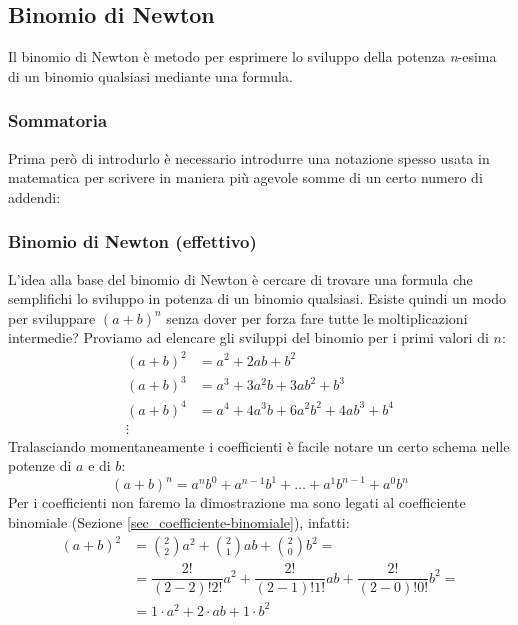 \subsection{Binomio di Newton} \label{sec_binomioNewton}
Il binomio di Newton è metodo per esprimere lo sviluppo della potenza \textit{n}-esima di un binomio qualsiasi mediante una formula.
\subsubsection{Sommatoria} \label{sec_sommatoria}
Prima però di introdurlo è necessario introdurre una notazione spesso usata in matematica per scrivere in maniera più agevole somme di un certo numero di addendi:

\subsubsection{Binomio di Newton (effettivo)}
L'idea alla base del binomio di Newton è cercare di trovare una formula che semplifichi lo sviluppo in potenza di un binomio qualsiasi. Esiste quindi un modo per sviluppare $(a+b)^n$ senza dover per forza fare tutte le moltiplicazioni intermedie? Proviamo ad elencare gli sviluppi del binomio per i primi valori di $n$:
\begin{align*}
    (a+b)^2 &= a^2 + 2ab + b^2\\
    (a+b)^3 &= a^3 + 3a^2b + 3ab^2 + b^3\\
    (a+b)^4 &= a^4 + 4a^3b + 6a^2b^2 + 4ab^3 + b^4\\
    \vdots \qquad
\end{align*}
Tralasciando momentaneamente i coefficienti è facile notare un certo schema nelle potenze di $a$ e di $b$:
\begin{equation*}
    (a+b)^n = a^nb^0 + a^{n-1}b^1 + \dots + a^1b^{n-1} + a^0b^n
\end{equation*}
Per i coefficienti non faremo la dimostrazione ma sono legati al coefficiente binomiale (Sezione \ref{sec_coefficiente-binomiale}), infatti:
\begin{align*}
    (a+b)^2 &= \binom{2}{2}a^2 + \binom{2}{1}ab + \binom{2}{0}b^2 = \\[2pt]
    &= \dfrac{2!}{(2-2)!2!}a^2 + \dfrac{2!}{(2-1)!1!}ab + \dfrac{2!}{(2-0)!0!}b^2 =\\[5pt]
    &= 1\cdot a^2 + 2\cdot ab + 1 \cdot b^2
\end{align*}

